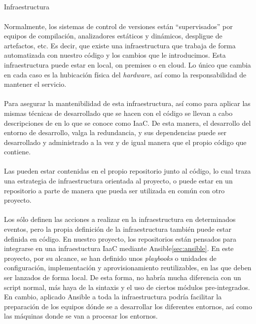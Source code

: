 \subsection{} Infraestructura

\paragraph{}Normalmente, los sistemas de control de versiones están ``supervisados''
por equipos de compilación, analizadores estáticos y dinámicos, despligue de artefactos,
etc. Es decir, que existe una infraestructura que trabaja de forma automatizada con
nuestro código y los cambios que le introducimos. Esta infraestructura puede estar
en local, \gls{on premises} o en cloud. Lo único que cambia en cada caso es la hubicación
física del \emph{hardware}, así como la responsabilidad de mantener el servicio.

\paragraph{}Para asegurar la mantenibilidad de esta infraestructura, así como para aplicar
las mismas técnicas de desarrollado que se hacen con el código se llevan a cabo descripciones
de  en lo que se conoce como \gls{IaaC}. De esta manera, el desarrollo
del entorno de desarrollo, valga la redundancia, y sus dependencias puede ser desarrollado
y administrado a la vez y de igual manera que el propio código que contiene.

\paragraph{}Las  pueden estar contenidas en el propio repositorio
junto al código, lo cual traza una estrategia de infraestructura orientada al proyecto,
o puede estar en un repositorio a parte de manera que pueda ser utilizada en común con
otro proyecto.

\paragraph{}Los  sólo definen las acciones a realizar en la infraestructura
en determinados eventos, pero la propia definición de la infraestructura también puede
estar definida en código. En nuestro proyecto, los repositorios están pensados para
integrarse en una infraestuctura \gls{IaaC} mediante Ansible\ref{sec:ansible}. En este
proyecto, por su alcance, se han definido unos \emph{playbooks} o unidades de configuración,
implementación y aprovisionamiento reutilizables, en las que deben ser lanzados de forma
local. De esta forma, no habría mucha diferencia con un script normal, más haya de la
sintaxis y el uso de ciertos módulos pre-integrados. En cambio, aplicado Ansible a toda
la infraestructura podría facilitar la preparación de los equipos dónde se a desarrollar
los diferentes entornos, así como las máquinas donde se van a procesar los entornos.

